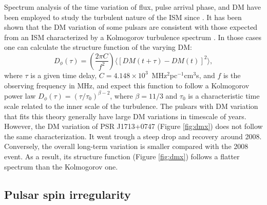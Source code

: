 
Spectrum analysis of the time variation of flux, pulse arrival phase, and DM have 
been employed to study the turbulent nature of the ISM since \citealt{cpl86, rl90}.
It has been shown that the DM variation of some pulsars are consistent with
those expected from an ISM characterized by a Kolmogorov turbulence spectrum
\citep{cwd+90, ric90, ktr94, yhc+07, kcs+13, fst14}. In those cases one can calculate the 
structure function of the varying DM: 
\begin{equation}
D_{\phi}(\tau)=\left(\frac{2\pi C}{f^2}\right)\langle [DM(t+\tau)-DM(t)]^2\rangle, 
\end{equation}
where $\tau$ 
is a given time delay, $C=4.148\times10^3$~MHz$^2$pc$^{-1}$cm$^3$s, and $f$ is 
the observing frequency in MHz, and expect 
this function to follow a Kolmogorov power law $D_{\phi}(\tau)=(\tau/\tau_0)^{\beta -2}$, 
where $\beta=11/3$ and $\tau_0$ is a characteristic time scale related to 
the inner scale of the turbulence. The pulsars with DM variation that fits this
theory generally have large DM variations in timescale of 
years. However, the DM variation of PSR J1713+0747 (Figure \ref{fig:dmx}) does not 
follow the same characterization. It went trough a steep drop and recovery 
around 2008. Conversely, the overall long-term variation is smaller
compared with the 2008 event. As a result, its structure function (Figure \ref{fig:dmx}) 
follows a flatter spectrum than the Kolmogorov one.


\subsection{Pulsar spin irregularity}
\label{sec:noise}


